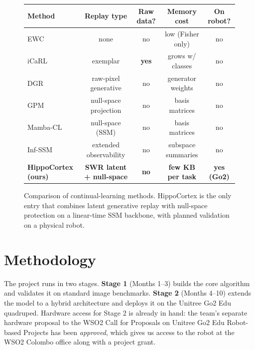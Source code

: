 \documentclass[11pt,a4paper]{article}
\begin{document}
\begin{figure}[ht]
\centering
\footnotesize
\setlength{\tabcolsep}{4pt}
\begin{tabular*}{\linewidth}{@{\extracolsep{\fill}}lcccc@{}}
\toprule
\textbf{Method} & \textbf{Replay type} & \textbf{Raw data?} & \textbf{Memory cost} & \textbf{On robot?} \\
\midrule
EWC~\citep{kirkpatrick2017overcoming}              & none                    & no            & low (Fisher only)   & no \\
iCaRL~\citep{rebuffi2017icarl}                     & exemplar                & \textbf{yes}  & grows w/ classes    & no \\
DGR~\citep{shin2017continual}                      & raw-pixel generative    & no            & generator weights   & no \\
GPM~\citep{saha2021gradient}                       & null-space projection   & no            & basis matrices      & no \\
Mamba-CL~\citep{cheng2024mambacl}                  & null-space (SSM)        & no            & basis matrices      & no \\
Inf-SSM~\citep{lee2025exemplarfree}                & extended observability  & no            & subspace summaries  & no \\
\rowcolor{nodegreen}\textbf{\color{neuroblue}HippoCortex (ours)}  & \textbf{\color{neuroblue}SWR latent + null-space} & \textbf{\color{neuroblue}no} & \textbf{\color{neuroblue}few KB per task} & \textbf{\color{neuroblue}yes (Go2)} \\
\bottomrule
\end{tabular*}
\caption{Comparison of continual-learning methods. HippoCortex is the only entry that combines latent generative replay with null-space protection on a linear-time SSM backbone, with planned validation on a physical robot.}
\label{fig:methodtable}
\end{figure}

\section{Methodology}

The project runs in two stages. \textbf{Stage 1} (Months 1--3) builds the core algorithm and validates it on standard image benchmarks. \textbf{Stage 2} (Months 4--10) extends the model to a hybrid architecture and deploys it on the Unitree Go2 Edu quadruped. Hardware access for Stage 2 is already in hand: the team's separate hardware proposal to the WSO2 Call for Proposals on Unitree Go2 Edu Robot-based Projects has been \emph{approved}, which gives us access to the robot at the WSO2 Colombo office along with a project grant.
\end{document}
